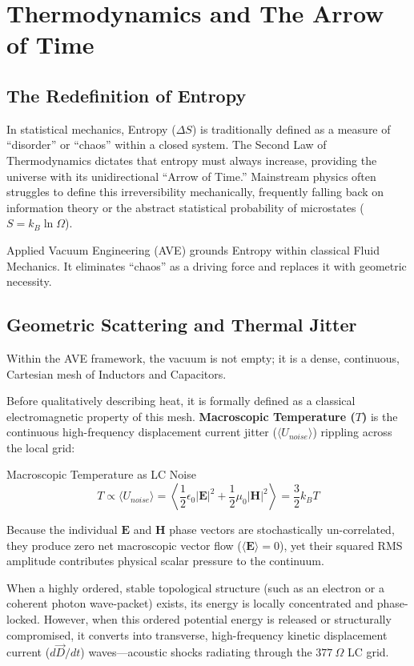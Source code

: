 \chapter{Thermodynamics and The Arrow of Time}
\label{ch:thermodynamics}

\section{The Redefinition of Entropy}
In statistical mechanics, Entropy ($\Delta S$) is traditionally defined as a measure of ``disorder'' or ``chaos'' within a closed system. The Second Law of Thermodynamics dictates that entropy must always increase, providing the universe with its unidirectional ``Arrow of Time.'' Mainstream physics often struggles to define this irreversibility mechanically, frequently falling back on information theory or the abstract statistical probability of microstates ($S = k_B \ln \Omega$).

Applied Vacuum Engineering (AVE) grounds Entropy within classical Fluid Mechanics. It eliminates ``chaos'' as a driving force and replaces it with geometric necessity.

\section{Geometric Scattering and Thermal Jitter}
Within the AVE framework, the vacuum is not empty; it is a dense, continuous, Cartesian mesh of Inductors and Capacitors. 

Before qualitatively describing heat, it is formally defined as a classical electromagnetic property of this mesh. \textbf{Macroscopic Temperature ($T$)} is the continuous high-frequency displacement current jitter ($\langle U_{noise} \rangle$) rippling across the local grid:
\begin{resultbox}{Macroscopic Temperature as LC Noise}
\begin{equation}
    T \propto \langle U_{noise} \rangle = \left\langle \frac{1}{2}\epsilon_0 |\mathbf{E}|^2 + \frac{1}{2}\mu_0 |\mathbf{H}|^2 \right\rangle = \frac{3}{2} k_B T
\end{equation}
\end{resultbox}
Because the individual $\mathbf{E}$ and $\mathbf{H}$ phase vectors are stochastically un-correlated, they produce zero net macroscopic vector flow ($\langle \mathbf{E} \rangle = 0$), yet their squared RMS amplitude contributes physical scalar pressure to the continuum. 

When a highly ordered, stable topological structure (such as an electron or a coherent photon wave-packet) exists, its energy is locally concentrated and phase-locked. However, when this ordered potential energy is released or structurally compromised, it converts into transverse, high-frequency kinetic displacement current ($d\vec{D}/dt$) waves---acoustic shocks radiating through the $377 \ \Omega$ LC grid.

